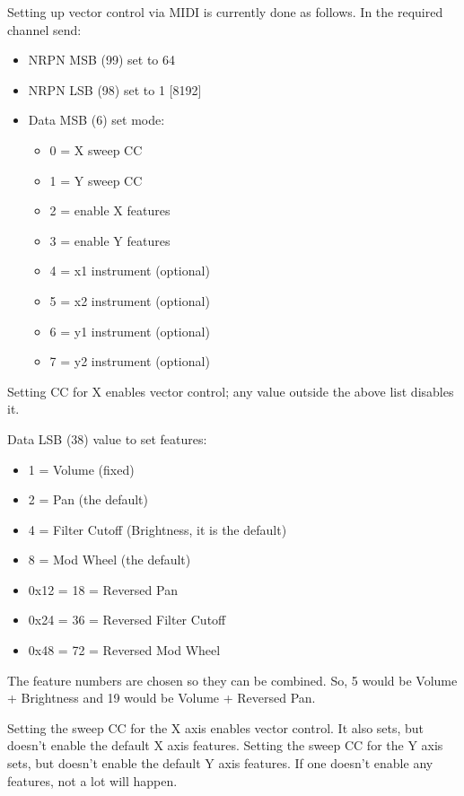    Setting up vector control via MIDI is currently done as follows.
   In the required channel send:

   \begin{itemize}
      \item NRPN MSB (99) set to 64
      \item NRPN LSB (98) set to 1 [8192]
      \item Data MSB (6) set mode:
      \begin{itemize}
         \item 0 = X sweep CC
         \item 1 = Y sweep CC
         \item 2 = enable X features
         \item 3 = enable Y features
         \item 4 = x1 instrument (optional)
         \item 5 = x2 instrument (optional)
         \item 6 = y1 instrument (optional)
         \item 7 = y2 instrument (optional)
      \end{itemize}
   \end{itemize}

   Setting CC for X enables vector control; any value outside the above list
   disables it.

   Data LSB (38) value to set features:

   \begin{itemize}
       \item 1 = Volume (fixed)
       \item 2 = Pan (the default)
       \item 4 = Filter Cutoff (Brightness, it is the default)
       \item 8 = Mod Wheel (the default)
       \item 0x12 = 18 = Reversed Pan
       \item 0x24 = 36 = Reversed Filter Cutoff
       \item 0x48 = 72 = Reversed Mod Wheel
   \end{itemize}

   The feature numbers are chosen so they can be combined. So, 5 would be
   Volume + Brightness and 19 would be Volume + Reversed Pan.

   Setting the sweep CC for the X axis enables vector control. It also sets,
   but doesn't enable the default X axis features.  Setting the sweep CC for
   the Y axis sets, but doesn't enable the default Y axis features.  If one
   doesn't enable any features, not a lot will happen.

